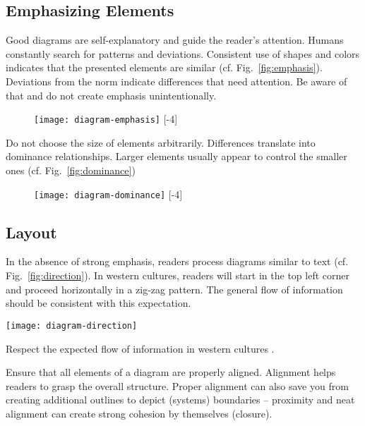 \subsection{Emphasizing Elements}

Good diagrams are self-explanatory and guide the reader's attention. Humans constantly search for patterns and deviations. Consistent use of shapes and colors indicates that the presented elements are similar (cf. Fig.~\ref{fig:emphasis}). Deviations from the norm indicate differences that need attention. Be aware of that and do not create emphasis unintentionally.

\begin{figure}[t]
\centering
\texttt{[image: diagram-emphasis]}
[-4\baselineskip]
\end{figure}

Do not choose the size of elements arbitrarily. Differences translate into dominance relationships. Larger elements usually appear to control the smaller ones (cf. Fig.~\ref{fig:dominance})

\begin{figure}[t]
\centering
\texttt{[image: diagram-dominance]}
[-4\baselineskip]
\end{figure}


\subsection{Layout}

In the absence of strong emphasis, readers process diagrams similar to text (cf. Fig.~\ref{fig:direction}). In western cultures, readers will start in the top left corner and proceed horizontally in a zig-zag pattern. The general flow of information should be consistent with this expectation.

\begin{marginfigure}
\centering
\texttt{[image: diagram-direction]}
\caption{\label{fig:direction} Respect the expected flow of information in western cultures \cite{Carter12}.}%
\end{marginfigure}


Ensure that all elements of a diagram are properly aligned. Alignment helps readers to grasp the overall structure. Proper alignment can also save you from creating additional outlines to depict (systems) boundaries – proximity and neat alignment can create strong cohesion by themselves (closure).

